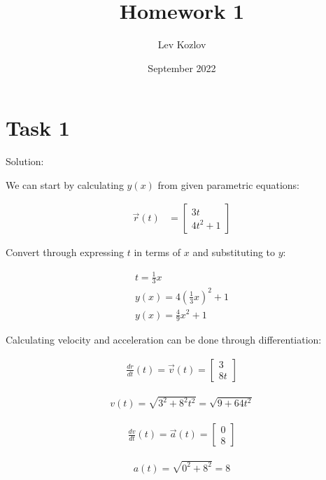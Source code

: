 \documentclass{article}
\title{Homework 1}
\author{Lev Kozlov}
\date{September 2022}
\begin{document}
\maketitle

\section{Task 1}

Solution:

We can start by calculating $y(x)$ from given parametric equations:


\begin{align}
    \vec{r}(t) & = \begin{bmatrix}
        3t \\
        4t^2 + 1
    \end{bmatrix}
\end{align}

Convert through expressing $t$ in terms of $x$ and substituting to $y$:

\begin{align}
    t = \frac{1}{3}x                        \\
    y(x) = 4\left(\frac{1}{3}x\right)^2 + 1 \\
    y(x) = \frac{4}{9}x^2 + 1
\end{align}

Calculating velocity and acceleration can be done through differentiation:

\begin{align}
    \frac{dr}{dt}(t) = \vec{v}(t) = \begin{bmatrix}
        3 \\
        8t
    \end{bmatrix}
\end{align}

\begin{align}
    v(t) = \sqrt{3^2 + 8^2t^2} = \sqrt{9 + 64t^2}
\end{align}

\begin{align}
    \frac{dv}{dt}(t) = \vec{a}(t) = \begin{bmatrix}
        0 \\
        8
    \end{bmatrix}
\end{align}

\begin{align}
    a(t) = \sqrt{0^2 + 8^2} = 8
\end{align}
\end{document}
